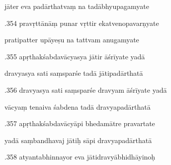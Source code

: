 \documentclass[article,12pt,a4paper]{memoir}%
\newcounter{parCount}
\begin{document}
	  
	  \pstart \leavevmode%
	jāter eva padārthatvaṃ na tadābhyupagamyate 
	{}
	\pend%
      

	  
	  \pstart {}.354 pravṛttānāṃ punar vṛttir   ekatvenopavarṇyate 
	{}
	\pend%
      

	  
	  \pstart \leavevmode%
	pratipatter upāyeṣu na tattvam anugamyate 
	{}
	\pend%
      

	  
	  \pstart {}.355 apṛthakśabdavācyasya jātir āśrīyate yadā 
	{}
	\pend%
      

	  
	  \pstart \leavevmode%
	dravyasya sati saṃsparśe tadā jātipadārthatā 
	{}
	\pend%
      

	  
	  \pstart {}.356 dravyasya sati saṃsparśe dravyam āśrīyate yadā 
	{}
	\pend%
      

	  
	  \pstart \leavevmode%
	vācyaṃ tenaiva śabdena tadā dravyapadārthatā 
	{}
	\pend%
      

	  
	  \pstart {}.357 apṛthakśabdavācyāpi bhedamātre pravartate 
	{}
	\pend%
      

	  
	  \pstart \leavevmode%
	yadā saṃbandhavaj jātiḥ sāpi dravyapadārthatā 
	{}
	\pend%
      

	  
	  \pstart {}.358 atyantabhinnayor eva jātidravyābhidhāyinoḥ 
	{}
	\pend%
      
\end{document}
